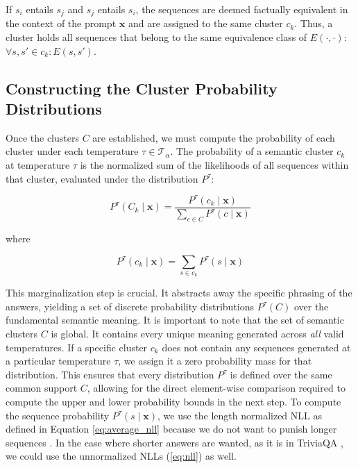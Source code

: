 If $s_i$ entails $s_j$ and $s_j$ entails $s_i$, the sequences are 
deemed factually equivalent in the context of the prompt $\mathbf{x}$ and are 
assigned to the same cluster $c_k$. Thus, a cluster holds all 
sequences  that belong to the same equivalence class of 
$E(\cdot, \cdot)$:  $\forall s, s' \in c_k : E(s, s')$. 

\subsection{Constructing the Cluster Probability Distributions}
\label{sec:methodology:generation:cluster_probability}
Once the clusters $C$ are established, we must compute the probability
of each cluster under each temperature $\tau \in \mathcal{T}_\alpha$.
The probability of a semantic cluster $c_k$ at temperature $\tau$ is 
the normalized sum of the likelihoods of all sequences within that 
cluster, evaluated under the distribution $P^\tau$:

\begin{equation}
    P^\tau(C_k \mid \mathbf{x}) = 
    \frac{P^\tau(c_k \mid \mathbf{x})}{\sum_{c \in C} P^\tau(c \mid \mathbf{x})}
    \label{eq:normalized_credal_cluster_probs}
\end{equation}

where

\begin{equation}
    P^\tau(c_k \mid \mathbf{x}) = \sum_{s \in c_k} P^\tau(s \mid \mathbf{x})
    \label{eq:credal_cluster_probs}
\end{equation}

This marginalization step is crucial. It abstracts away the specific
phrasing of the answers, yielding a set of discrete probability 
distributions $P^\tau(C)$ over the fundamental semantic meaning. 
It is important to note that the set of semantic clusters $C$
is global. It contains every unique meaning generated across 
\textit{all} valid temperatures.
If a specific cluster $c_k$ does not contain any sequences generated 
at a particular temperature $\tau$, we assign it a zero probability 
mass for that distribution. This ensures that every distribution 
$P^\tau$ is defined over the same common support $C$, allowing for 
the direct element-wise comparison required to compute the upper and
lower probability bounds in the next step. To compute the sequence
probability $P^\tau(s \mid \mathbf{x})$, we use the length normalized
NLL as defined in Equation \ref{eq:average_nll} because we do not want to
punish longer sequences 
\parencite{malinin2021uncertaintyestimationautoregressivestructured}. 
In the case where shorter answers are wanted, as it is in TriviaQA 
\parencite{joshi2017triviaqalargescaledistantly}, we could use the
unnormalized NLLs (\ref{eq:nll}) as well.

